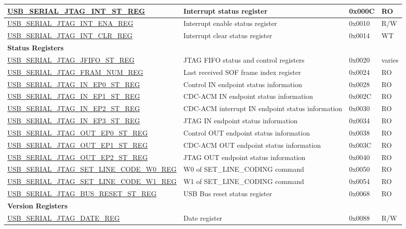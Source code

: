 \begin{longtable}{ | p{7.3cm} | p{5.7cm} | p{1.2cm} | p{1.5cm} | }
\hyperref[regdesc:USBSERIALJTAGINTSTREG]{USB\_SERIAL\_JTAG\_INT\_ST\_REG} & Interrupt status register & 0x000C & RO \\ \hline
\hyperref[regdesc:USBSERIALJTAGINTENAREG]{USB\_SERIAL\_JTAG\_INT\_ENA\_REG} & Interrupt enable status register & 0x0010 & R/W \\ \hline
\hyperref[regdesc:USBSERIALJTAGINTCLRREG]{USB\_SERIAL\_JTAG\_INT\_CLR\_REG} & Interrupt clear status register & 0x0014 & WT \\ \hline
\multicolumn{4}{|l|}{\textbf{Status Registers}} \\ \hline
\hyperref[regdesc:USBSERIALJTAGJFIFOSTREG]{USB\_SERIAL\_JTAG\_JFIFO\_ST\_REG} & JTAG FIFO status and control registers & 0x0020 & varies \\ \hline
\hyperref[regdesc:USBSERIALJTAGFRAMNUMREG]{USB\_SERIAL\_JTAG\_FRAM\_NUM\_REG} & Last received SOF frame index register & 0x0024 & RO \\ \hline
\hyperref[regdesc:USBSERIALJTAGINEP0STREG]{USB\_SERIAL\_JTAG\_IN\_EP0\_ST\_REG} & Control IN endpoint status information & 0x0028 & RO \\ \hline
\hyperref[regdesc:USBSERIALJTAGINEP1STREG]{USB\_SERIAL\_JTAG\_IN\_EP1\_ST\_REG} & CDC-ACM IN endpoint status information & 0x002C & RO \\ \hline
\hyperref[regdesc:USBSERIALJTAGINEP2STREG]{USB\_SERIAL\_JTAG\_IN\_EP2\_ST\_REG} & CDC-ACM interrupt IN endpoint status information & 0x0030 & RO \\ \hline
\hyperref[regdesc:USBSERIALJTAGINEP3STREG]{USB\_SERIAL\_JTAG\_IN\_EP3\_ST\_REG} & JTAG IN endpoint status information & 0x0034 & RO \\ \hline
\hyperref[regdesc:USBSERIALJTAGOUTEP0STREG]{USB\_SERIAL\_JTAG\_OUT\_EP0\_ST\_REG} & Control OUT endpoint status information & 0x0038 & RO \\ \hline
\hyperref[regdesc:USBSERIALJTAGOUTEP1STREG]{USB\_SERIAL\_JTAG\_OUT\_EP1\_ST\_REG} & CDC-ACM OUT endpoint status information & 0x003C & RO \\ \hline
\hyperref[regdesc:USBSERIALJTAGOUTEP2STREG]{USB\_SERIAL\_JTAG\_OUT\_EP2\_ST\_REG} & JTAG OUT endpoint status information & 0x0040 & RO \\ \hline
\hyperref[regdesc:USBSERIALJTAGSETLINECODEW0REG]{USB\_SERIAL\_JTAG\_SET\_LINE\_CODE\_W0\_REG} & W0 of SET\_LINE\_CODING command & 0x0050 & RO \\ \hline
\hyperref[regdesc:USBSERIALJTAGSETLINECODEW1REG]{USB\_SERIAL\_JTAG\_SET\_LINE\_CODE\_W1\_REG} & W1 of SET\_LINE\_CODING command & 0x0054 & RO \\ \hline
\hyperref[regdesc:USBSERIALJTAGBUSRESETSTREG]{USB\_SERIAL\_JTAG\_BUS\_RESET\_ST\_REG} & USB Bus reset status register & 0x0068 & RO \\ \hline
\multicolumn{4}{|l|}{\textbf{Version Registers}} \\ \hline
\hyperref[regdesc:USBSERIALJTAGDATEREG]{USB\_SERIAL\_JTAG\_DATE\_REG} & Date register & 0x0088 & R/W \\ \hline
\end{longtable}
